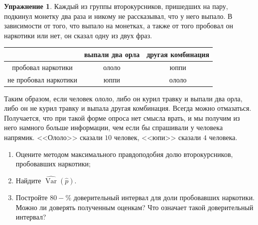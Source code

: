 \documentclass[12pt, a4paper, oneside]{extreport}
\DeclareMathOperator{\Var}{Var}
\theoremstyle{plain}              %
\theoremstyle{definition}         %
\newtheorem{problem}{\color{myblue} Упражнение}
\begin{document}
\begin{problem} 
Каждый из группы второкурсников, пришедших на пару, подкинул монетку два раза и никому не рассказывал, что у него выпало. В зависимости от того, что выпало на монетках, а также от того пробовал он наркотики или нет, он сказал одну из двух фраз.
	
	\begin{center}
		\begin{tabular}{c|c|c}
		                                 &  выпали два орла   & другая комбинация   \\ \hline
пробовал наркотики      &   ололо                     &   юппи       \\ \hline
не пробовал наркотики &	  юппи	                     &   ололо      \\
		\end{tabular}
	\end{center}
	
Таким образом, если человек ололо, либо он курил травку и выпали два орла, либо он не курил травку и выпала другая комбинация. Всегда можно отмазаться. Получается, что при такой форме опроса нет смысла врать, и мы получим из него намного больше информации, чем если бы спрашивали у человека напрямик.  <<Ололо>> сказали $10$ человек, <<юпи>> сказали $4$ человека.

\begin{enumerate}
	\item  Оцените методом максимального правдоподобия долю второкурсников, пробовавших наркотики;
	\item Найдите $\hat{\Var}(\hat p)$. 
	\item Постройте $80-\%$ доверительный интервал для доли пробовавших наркотики. Можно ли доверять полученным оценкам? Что означает такой доверительный интервал? 
\end{enumerate}
\end{problem}
\end{document}
